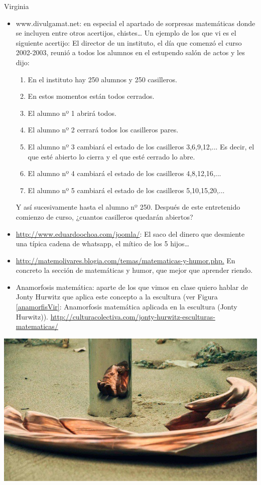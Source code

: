 \begin{opin}{\virgicolor}{Virginia}
\begin{itemize}
\item www.divulgamat.net: en especial el apartado de sorpresas matemáticas donde se incluyen entre otros acertijos, chistes… Un ejemplo de los que vi es el siguiente acertijo: 
El director de un instituto, el día que comenzó el curso 2002-2003, reunió a todos los alumnos en el estupendo salón de actos y les dijo:
\begin{enumerate}
\item En el instituto hay 250 alumnos y 250 casilleros.
\item En estos momentos están todos cerrados.
\item El alumno nº 1 abrirá todos.
\item El alumno nº 2 cerrará todos los casilleros pares.
\item El alumno nº 3 cambiará el estado de los casilleros 3,6,9,12,... Es decir, el que esté abierto lo cierra y el que esté cerrado lo abre.
\item El alumno nº 4 cambiará el estado de los casilleros 4,8,12,16,...
\item El alumno nº 5 cambiará el estado de los casilleros 5,10,15,20,...
\end{enumerate}
Y así sucesivamente hasta el alumno nº 250.
Después de este entretenido comienzo de curso, ¿cuantos casilleros quedarán abiertos?
\item \url{http://www.eduardoochoa.com/joomla/}: El saco del dinero que desmiente una típica cadena de whatsapp, el mítico de los 5 hijos… 

\item \url{http://matemolivares.blogia.com/temas/matematicas-y-humor.php.} En concreto la sección de matemáticas y humor, que mejor que aprender riendo. 

\item Anamorfosis matemática: aparte de los que vimos en clase quiero hablar de Jonty Hurwitz que aplica este concepto a la escultura (ver Figura \ref{anamorfisVir}: Anamorfosis matemática aplicada en la escultura (Jonty Hurwitz)).  \url{http://culturacolectiva.com/jonty-hurwitz-esculturas-matematicas/} 
\end{itemize}



\begin{minipage}[hbtp]{1.0\linewidth}
	\centering
	\includegraphics[width=0.6\linewidth]{img/viryin.jpg}
	\label{anamorfisVir}
\end{minipage}


\end{opin}
